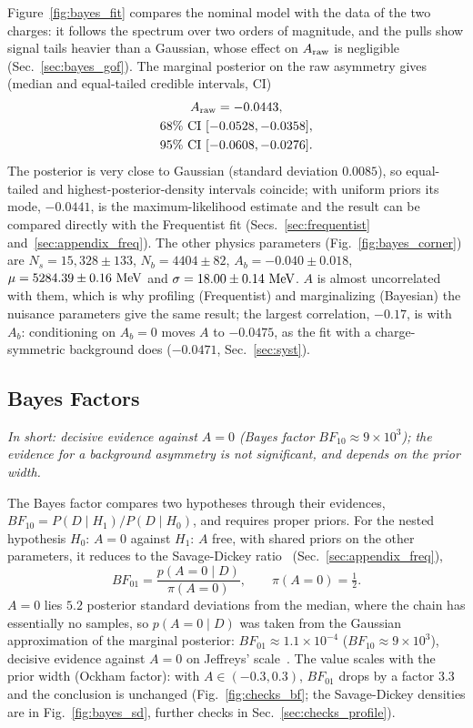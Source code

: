 Figure~\ref{fig:bayes_fit} compares the nominal model with the data of the two charges: it follows the spectrum over two orders of magnitude, and the pulls show signal tails heavier than a Gaussian, whose effect on $A_{\mathrm{raw}}$ is negligible (Sec.~\ref{sec:bayes_gof}). The marginal posterior on the raw asymmetry gives (median and equal-tailed credible intervals, CI)
\begin{gather*}
A_{\mathrm{raw}} = -0.0443, \\
68\%~\text{CI}~[-0.0528,-0.0358], \\ 95\%~\text{CI}~[-0.0608,-0.0276].
\end{gather*}
The posterior is very close to Gaussian (standard deviation $0.0085$), so equal-tailed and highest-posterior-density intervals coincide; with uniform priors its mode, $-0.0441$, is the maximum-likelihood estimate and the result can be compared directly with the Frequentist fit (Secs.~\ref{sec:frequentist} and~\ref{sec:appendix_freq}). The other physics parameters (Fig.~\ref{fig:bayes_corner}) are $N_s=15{,}328\pm133$, $N_b=4404\pm82$, $A_b=-0.040\pm0.018$, $\mu=5284.39\pm0.16\,\,\text{Me\hspace{-.08em}V}$ and $\sigma=18.00\pm0.14\,\,\text{Me\hspace{-.08em}V}$. $A$ is almost uncorrelated with them, which is why profiling (Frequentist) and marginalizing (Bayesian) the nuisance parameters give the same result; the largest correlation, $-0.17$, is with $A_b$: conditioning on $A_b=0$ moves $A$ to $-0.0475$, as the fit with a charge-symmetric background does ($-0.0471$, Sec.~\ref{sec:syst}).




\subsection{Bayes Factors}
\label{sec:bayes_factor}
\emph{In short: decisive evidence against $A=0$ (Bayes factor $BF_{10}\approx9\times10^3$); the evidence for a background asymmetry is not significant, and depends on the prior width.}

The Bayes factor compares two hypotheses through their evidences, $BF_{10}=P(D\mid H_1)/P(D\mid H_0)$, and requires proper priors. For the nested hypothesis $H_0$: $A=0$ against $H_1$: $A$ free, with shared priors on the other parameters, it reduces to the Savage-Dickey ratio~\cite{dickey1971} (Sec.~\ref{sec:appendix_freq}),
\[
BF_{01} = \frac{p(A=0\mid D)}{\pi(A=0)}, \qquad \pi(A=0)=\tfrac12 .
\]
$A=0$ lies $5.2$ posterior standard deviations from the median, where the chain has essentially no samples, so $p(A=0\mid D)$ was taken from the Gaussian approximation of the marginal posterior: $BF_{01}\approx1.1\times10^{-4}$ ($BF_{10}\approx9\times10^{3}$), decisive evidence against $A=0$ on Jeffreys' scale~\cite{jeffreys}. The value scales with the prior width (Ockham factor): with $A\in(-0.3,0.3)$, $BF_{01}$ drops by a factor $3.3$ and the conclusion is unchanged (Fig.~\ref{fig:checks_bf}; the Savage-Dickey densities are in Fig.~\ref{fig:bayes_sd}, further checks in Sec.~\ref{sec:checks_profile}).

